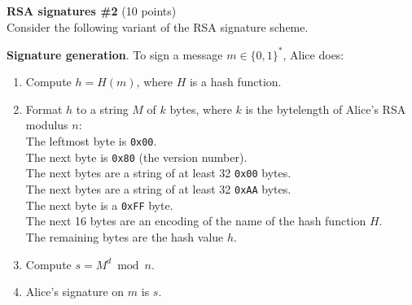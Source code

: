 \begin{problem}{\bf RSA signatures \#2} (10 points)\\
Consider the following variant of the RSA signature scheme.

\noindent
{\bf Signature generation}. To sign a message $m \in \{0,1\}^*$, Alice does:
\begin{enumerate}[label=(\alph*)]
\item Compute $h = H(m)$, where $H$ is a hash function.
\item Format $h$ to a string $M$ of $k$ bytes, where $k$ is the bytelength of
Alice's RSA modulus $n$:\\
\hspace*{10mm}The leftmost byte is \texttt{0x00}.\\
\hspace*{10mm}The next byte is \texttt{0x80} (the version number).\\
\hspace*{10mm}The next bytes are a string of at least 32 \texttt{0x00}
   bytes.\\
\hspace*{10mm}The next bytes are a string of at least 32 \texttt{0xAA}
   bytes.\\
\hspace*{10mm}The next byte is a \texttt{0xFF} byte.\\
\hspace*{10mm}The next 16 bytes are an encoding of the name of the
   hash function $H$.\\
\hspace*{10mm}The remaining bytes are the hash value $h$.
\item Compute $s = M^d \bmod{n}$.
\item Alice's signature on $m$ is $s$.
\end{enumerate}


\end{problem}
